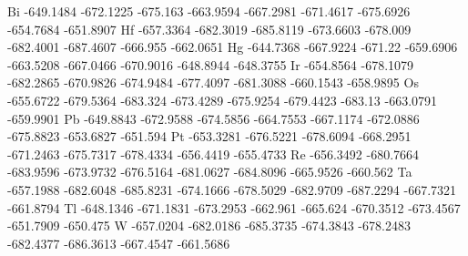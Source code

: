 Bi	-649.1484	-672.1225	-675.163	-663.9594	-667.2981	-671.4617	-675.6926	-654.7684	-651.8907
Hf	-657.3364	-682.3019	-685.8119	-673.6603	-678.009	-682.4001	-687.4607	-666.955	-662.0651
Hg	-644.7368	-667.9224	-671.22		-659.6906	-663.5208	-667.0466	-670.9016	-648.8944	-648.3755
Ir	-654.8564	-678.1079	-682.2865	-670.9826	-674.9484	-677.4097	-681.3088	-660.1543	-658.9895
Os	-655.6722	-679.5364	-683.324	-673.4289	-675.9254	-679.4423	-683.13		-663.0791	-659.9901
Pb	-649.8843	-672.9588	-674.5856	-664.7553	-667.1174	-672.0886	-675.8823	-653.6827	-651.594
Pt	-653.3281	-676.5221	-678.6094	-668.2951	-671.2463	-675.7317	-678.4334	-656.4419	-655.4733
Re	-656.3492	-680.7664	-683.9596	-673.9732	-676.5164	-681.0627	-684.8096	-665.9526	-660.562
Ta	-657.1988	-682.6048	-685.8231	-674.1666	-678.5029	-682.9709	-687.2294	-667.7321	-661.8794
Tl	-648.1346	-671.1831	-673.2953	-662.961	-665.624	-670.3512	-673.4567	-651.7909	-650.475
W	-657.0204	-682.0186	-685.3735	-674.3843	-678.2483	-682.4377	-686.3613	-667.4547	-661.5686


